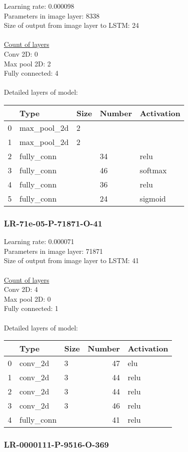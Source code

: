 Learning rate: 0.000098
\\Parameters in image layer: 8338
\\Size of output from image layer to LSTM: 24
\\\\\underline{Count of layers} 
\\Conv 2D:           0\\Max pool 2D:      2\\Fully connected:  4
\\\\Detailed layers of model: \\\begin{tabular}{rllll}
\hline
    & Type        & Size   & Number   & Activation   \\
\hline
  0 & max\_pool\_2d & 2      &          &              \\
  1 & max\_pool\_2d & 2      &          &              \\
  2 & fully\_conn  &        & 34       & relu         \\
  3 & fully\_conn  &        & 46       & softmax      \\
  4 & fully\_conn  &        & 36       & relu         \\
  5 & fully\_conn  &        & 24       & sigmoid      \\
\hline
\end{tabular}\subsubsection*{LR-71e-05-P-71871-O-41}
Learning rate: 0.000071
\\Parameters in image layer: 71871
\\Size of output from image layer to LSTM: 41
\\\\\underline{Count of layers} 
\\Conv 2D:           4\\Max pool 2D:      0\\Fully connected:  1
\\\\Detailed layers of model: \\\begin{tabular}{rllrl}
\hline
    & Type       & Size   &   Number & Activation   \\
\hline
  0 & conv\_2d    & 3      &       47 & elu          \\
  1 & conv\_2d    & 3      &       44 & relu         \\
  2 & conv\_2d    & 3      &       44 & relu         \\
  3 & conv\_2d    & 3      &       46 & relu         \\
  4 & fully\_conn &        &       41 & relu         \\
\hline
\end{tabular}\subsubsection*{LR-0000111-P-9516-O-369}
